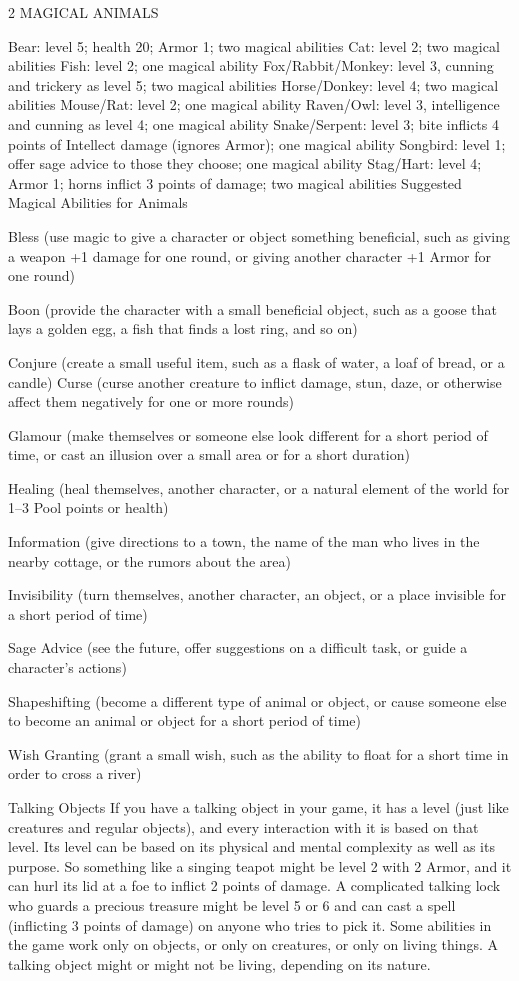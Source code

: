 \begin{multicols}{2}
MAGICAL ANIMALS

Bear: level 5; health 20; Armor 1; two magical abilities
Cat: level 2; two magical abilities
Fish: level 2; one magical ability
Fox/Rabbit/Monkey: level 3, cunning and trickery as level 5; two magical abilities
Horse/Donkey: level 4; two magical abilities
Mouse/Rat: level 2; one magical ability
Raven/Owl: level 3, intelligence and cunning as level 4; one magical ability
Snake/Serpent: level 3; bite inflicts 4 points of Intellect damage (ignores Armor); one magical ability
Songbird: level 1; offer sage advice to those they choose; one magical ability
Stag/Hart: level 4; Armor 1; horns inflict 3 points of damage; two magical abilities
Suggested Magical Abilities for Animals

Bless (use magic to give a character or object something beneficial, such as giving a weapon +1 damage for one round, or giving another character +1 Armor for one round)

Boon (provide the character with a small beneficial object, such as a goose that lays a golden egg, a fish that finds a lost ring, and so on)

Conjure (create a small useful item, such as a flask of water, a loaf of bread, or a candle)
Curse (curse another creature to inflict damage, stun, daze, or otherwise affect them negatively for one or more rounds)

Glamour (make themselves or someone else look different for a short period of time, or cast an illusion over a small area or for a short duration)

Healing (heal themselves, another character, or a natural element of the world for 1–3 Pool points or health)

Information (give directions to a town, the name of the man who lives in the nearby cottage, or the rumors about the area)

Invisibility (turn themselves, another character, an object, or a place invisible for a short period of time)

Sage Advice (see the future, offer suggestions on a difficult task, or guide a character’s actions)

Shapeshifting (become a different type of animal or object, or cause someone else to become an animal or object for a short period of time)

Wish Granting (grant a small wish, such as the ability to float for a short time in order to cross a river)

Talking Objects
If you have a talking object in your game, it has a level (just like creatures and regular objects), and every interaction with it is based on that level. Its level can be based on
its physical and mental complexity as well as its purpose. So something like a singing teapot might be level 2 with 2 Armor, and it can hurl its lid at a foe to inflict 2 points of damage. A complicated talking lock who guards a precious treasure might be level 5 or 6 and can cast a spell (inflicting 3 points of damage) on anyone who tries to pick it.
Some abilities in the game work only on objects, or only on creatures, or only on living things. A talking object might or might not be living, depending on its nature.


\end{multicols}
